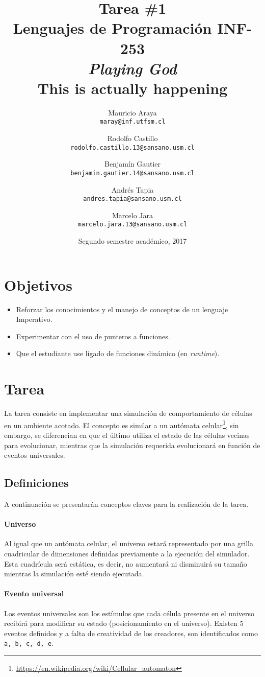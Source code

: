 \documentclass[letterpaper,10pt]{article}
\title{Tarea \#1\\Lenguajes de Programación INF-253\\ \textit{Playing God}\\
\tiny{This is actually happening}}
\author{{\small Mauricio Araya} \\
    \texttt{{\small maray@inf.utfsm.cl}} \and
    {\small Rodolfo Castillo}\\
    \texttt{{\small rodolfo.castillo.13@sansano.usm.cl}}
    \and {\small Benjamín Gautier} \\
    \texttt{{\small benjamin.gautier.14@sansano.usm.cl}}
    \and {\small Andrés Tapia} \\
    \texttt{{\small andres.tapia@sansano.usm.cl}}
    \and {\small Marcelo Jara}\\
    \texttt{{\small \texttt{marcelo.jara.13@sansano.usm.cl}}} }
\date{Segundo semestre académico, 2017}
\begin{document}
\maketitle
\section{Objetivos}
\begin{itemize}
    \item
        Reforzar los conocimientos y el manejo de conceptos de un lenguaje Imperativo.

    \item
        Experimentar con el uso de punteros a funciones.
    
    \item
        Que el estudiante use ligado de funciones dinámico (en \emph{runtime}).
\end{itemize}

\section{Tarea}

La tarea consiste en implementar una simulación de comportamiento de células en un ambiente acotado. El concepto es similar a un autómata celular\footnote{\href{https://en.wikipedia.org/wiki/Cellular\_automaton}{https://en.wikipedia.org/wiki/Cellular\_automaton}}, sin embargo, se diferencian en que el último utiliza el estado de las células vecinas para evolucionar, mientras que la simulación requerida evolucionará en función de eventos universales.

\subsection{Definiciones}

A continuación se presentarán conceptos claves para la realización de la tarea.

\paragraph{Universo}
Al igual que un autómata celular, el universo estará representado por una grilla cuadricular de dimensiones definidas previamente a la ejecución del simulador. Esta cuadrícula será estática, es decir, no aumentará ni disminuirá su tamaño mientras la simulación esté siendo ejecutada.

\paragraph{Evento universal} 
Los eventos universales son los estímulos que cada célula presente en el universo recibirá para modificar su estado (posicionamiento en el universo). Existen 5 eventos definidos y a falta de creatividad de los creadores, son identificados como \texttt{a, b, c, d, e}.
\end{document}
